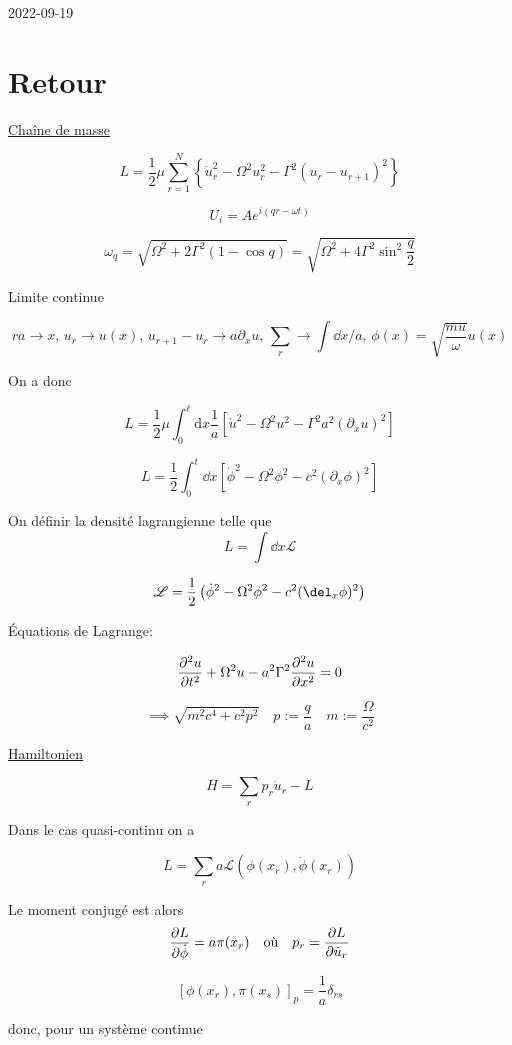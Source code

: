 


2022-09-19

\section*{Retour}

\underline{Chaîne de masse} 

$$L=\frac{1}{2} \mu \sum_{r=1}^N\left\{\dot{u}_r^2-\Omega^2 u_r^2-\Gamma^2\left(u_r-u_{r+1}\right)^2\right\}$$ 

$$U_i =  A e^{i \left( qr -\omega t \right) }$$ 

$$\omega_q = \sqrt{\Omega^{2}+ 2 \Gamma^{2}\left( 1-\cos q \right) } = \sqrt{\Omega^{2}+ 4\Gamma^{2}\sin^{2} \frac{q}{2} }$$ 


Limite continue

$$ra \to x,\, u_r \to u(x),\, u_{r+1} - u_r \to a \partial_x u ,\, \sum_r \to \int \dd x/a,\, \phi(x) = \sqrt{\frac{mu}{\omega} } u(x) $$ 

On a donc 

$$L=\frac{1}{2} \mu \int_0^{\ell} \mathrm{d} x \frac{1}{a}\left[\dot{u}^2-\Omega^2 u^2-\Gamma^2 a^2\left(\partial_x u\right)^2\right]$$ 

$$L = \frac{1}{2} \int_{0}^{t}\dd x \left[ \dot \phi^{2} -\Omega^{2}\phi^{2}-c^{2}(\partial_x \phi )^2 \right] $$ 


On définir la densité lagrangienne telle que $$L = \int \dd x \mathscr{L} 	$$ 

$$\mathscr{L} = \frac{1}{2} \left( \dot \phi^{2}-\Omega^{2}\phi^{2}- c^{2}(\del_x \phi)^2 \right) $$ 


Équations de Lagrange:

$$\pdv[2]{u}{t} + \Omega^{2}u - a^{2}\Gamma^{2} \pdv[2]{u}{x} =0$$ 

$$\implies \sqrt{m^{2} c^{4} + c^{2}p^{2}} \quad p:= \frac{q}{a} \quad m := \frac{\Omega}{c^{2} } $$ 

\underline{Hamiltonien} 

$$H = \sum_r p_r \dot u_r -L $$ 

Dans le cas quasi-continu on a 

$$L  = \sum _r a \mathscr{L}(\phi(x_r ), \dot \phi(x_r ))$$ 


Le moment conjugé est alors $$\pdv{L}{\dot\phi} = a \pi (x_r ) \qq{où} p_r = \pdv{L}{\dot u_r } $$ 

$$ [\phi(x_r ),\pi(x_s)]_p = \frac{1}{a} \delta_{rs}  $$ 

donc, pour un système continue 

